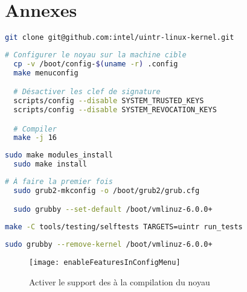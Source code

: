 \newpage

\section{Annexes}

\begin{lstlisting}[language=bash, caption=Récupération du code source du noyau Linux patché]
  git clone git@github.com:intel/uintr-linux-kernel.git
\end{lstlisting}

\begin{lstlisting}[language=bash, caption=Configurer et compiler le noyau]
  # Configurer le noyau sur la machine cible
  cp -v /boot/config-$(uname -r) .config
  make menuconfig

  # Désactiver les clef de signature
  scripts/config --disable SYSTEM_TRUSTED_KEYS
  scripts/config --disable SYSTEM_REVOCATION_KEYS

  # Compiler
  make -j 16
\end{lstlisting}

\begin{lstlisting}[language=bash, caption=Installer le noyau]
  sudo make modules_install
  sudo make install
\end{lstlisting}

\begin{lstlisting}[language=bash, caption=Utiliser le noyau installé]
  # À faire la premier fois
  sudo grub2-mkconfig -o /boot/grub2/grub.cfg

  sudo grubby --set-default /boot/vmlinuz-6.0.0+
\end{lstlisting}

\begin{lstlisting}[language=bash, caption=Lancer les tests \uintr{} du noyau (le noyau doit être installé)]
  make -C tools/testing/selftests TARGETS=uintr run_tests
\end{lstlisting}

\begin{lstlisting}[language=bash, caption=Supprimer le noyau installé]
  sudo grubby --remove-kernel /boot/vmlinuz-6.0.0+
\end{lstlisting}

\begin{figure}[H]
  \texttt{[image: enableFeaturesInConfigMenu]}
  \caption{Activer le support des \uintr{} à la compilation du noyau}
  \label{fig:enableFeaturesInConfigMenu}
\end{figure}

